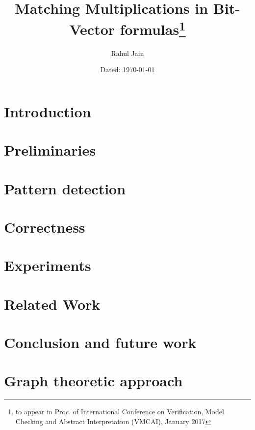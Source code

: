 \documentclass{report}
\begin{document}
\title{Matching Multiplications in Bit-Vector formulas\footnote{to appear in Proc. of International Conference on Verification, Model Checking and Abstract Interpretation (VMCAI), January 2017}}




\author{Rahul Jain}

\date{Dated: \today}

\maketitle

\begin{abstract}

\end{abstract}


\tableofcontents

%
\chapter{Introduction}
\label{sec:intro}


\chapter{Preliminaries}
\label{sec:prelim}


\chapter{Pattern detection}
\label{sec:pattern}


\chapter{Correctness}
\label{sec:correct}


\chapter{Experiments}
\label{sec:experiments}



 \chapter{Related Work}
 \label{sec:related}
 

\chapter{Conclusion and future work}
\label{sec:conclusion}


\chapter{Graph theoretic approach}
\label{sec:exploratory}




\end{document}
